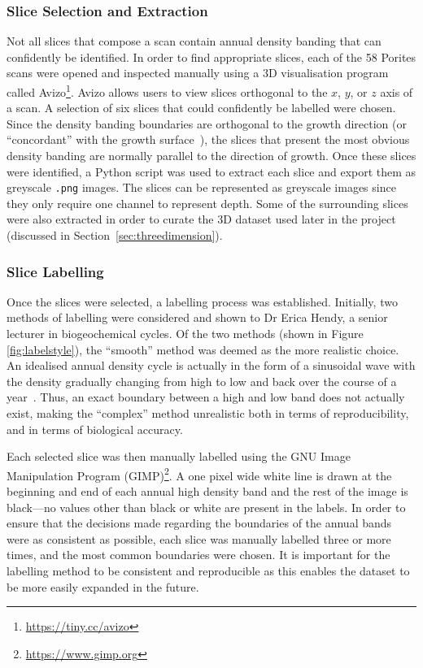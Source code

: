 \subsubsection{Slice Selection and Extraction}

Not all slices that compose a scan contain annual density banding that can confidently be identified. In order to find appropriate slices, each of the 58 Porites scans were opened and inspected manually using a 3D visualisation program called Avizo\footnote{\url{https://tiny.cc/avizo}}. Avizo allows users to view slices orthogonal to the $x$, $y$, or $z$ axis of a scan. A selection of six slices that could confidently be labelled were chosen. Since the density banding boundaries are orthogonal to the growth direction (or ``concordant'' with the growth surface~\cite{knutson}), the slices that present the most obvious density banding are normally parallel to the direction of growth. Once these slices were identified, a Python script was used to extract each slice and export them as greyscale \texttt{.png} images. The slices can be represented as greyscale images since they only require one channel to represent depth. Some of the surrounding slices were also extracted in order to curate the 3D dataset used later in the project (discussed in Section~\ref{sec:threedimension}).

\subsubsection{Slice Labelling}

Once the slices were selected, a labelling process was established. Initially, two methods of labelling were considered and shown to Dr Erica Hendy, a senior lecturer in biogeochemical cycles. Of the two methods (shown in Figure \ref{fig:labelstyle}), the ``smooth'' method was deemed as the more realistic choice. An idealised annual density cycle is actually in the form of a sinusoidal wave with the density gradually changing from high to low and back over the course of a year~\cite[p. 39]{coralsine}. Thus, an exact boundary between a high and low band does not actually exist, making the ``complex'' method unrealistic both in terms of reproducibility, and in terms of biological accuracy.

Each selected slice was then manually labelled using the GNU Image Manipulation Program (GIMP)\footnote{\url{https://www.gimp.org}}. A one pixel wide white line is drawn at the beginning and end of each annual high density band and the rest of the image is black---no values other than black or white are present in the labels. In order to ensure that the decisions made regarding the boundaries of the annual bands were as consistent as possible, each slice was manually labelled three or more times, and the most common boundaries were chosen. It is important for the labelling method to be consistent and reproducible as this enables the dataset to be more easily expanded in the future.

